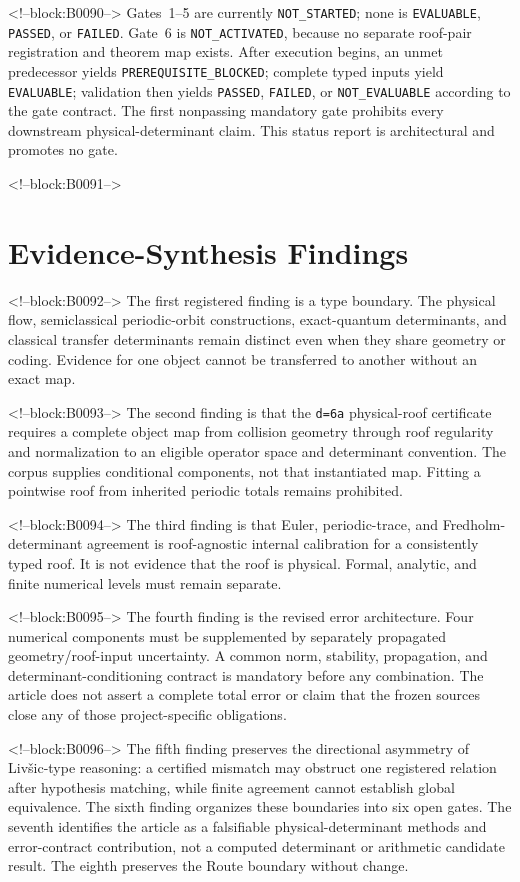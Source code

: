 \documentclass[11pt,a4paper]{article}
\begin{document}
<!--block:B0090-->
Gates~1--5 are currently \texttt{NOT_STARTED}; none is
\texttt{EVALUABLE}, \texttt{PASSED}, or \texttt{FAILED}.  Gate~6 is
\texttt{NOT_ACTIVATED}, because no separate roof-pair registration and theorem
map exists.  After execution begins, an unmet predecessor yields
\texttt{PREREQUISITE_BLOCKED}; complete typed inputs yield
\texttt{EVALUABLE}; validation then yields \texttt{PASSED},
\texttt{FAILED}, or \texttt{NOT_EVALUABLE} according to the gate contract.
The first nonpassing mandatory gate prohibits every downstream
physical-determinant claim.  This status report is architectural and promotes
no gate.

<!--block:B0091-->
\section{Evidence-Synthesis Findings}

<!--block:B0092-->
The first registered finding is a type boundary. The physical flow, semiclassical periodic-orbit constructions, exact-quantum determinants, and classical transfer determinants remain distinct even when they share geometry or coding. Evidence for one object cannot be transferred to another without an exact map.

<!--block:B0093-->
The second finding is that the \texttt{d=6a} physical-roof certificate requires a complete object map from collision geometry through roof regularity and normalization to an eligible operator space and determinant convention. The corpus supplies conditional components, not that instantiated map. Fitting a pointwise roof from inherited periodic totals remains prohibited.

<!--block:B0094-->
The third finding is that Euler, periodic-trace, and Fredholm-determinant agreement is roof-agnostic internal calibration for a consistently typed roof. It is not evidence that the roof is physical. Formal, analytic, and finite numerical levels must remain separate.

<!--block:B0095-->
The fourth finding is the revised error architecture. Four numerical components must be supplemented by separately propagated geometry/roof-input uncertainty. A common norm, stability, propagation, and determinant-conditioning contract is mandatory before any combination. The article does not assert a complete total error or claim that the frozen sources close any of those project-specific obligations.

<!--block:B0096-->
The fifth finding preserves the directional asymmetry of Livšic-type reasoning: a certified mismatch may obstruct one registered relation after hypothesis matching, while finite agreement cannot establish global equivalence. The sixth finding organizes these boundaries into six open gates. The seventh identifies the article as a falsifiable physical-determinant methods and error-contract contribution, not a computed determinant or arithmetic candidate result. The eighth preserves the Route boundary without change.
\end{document}
